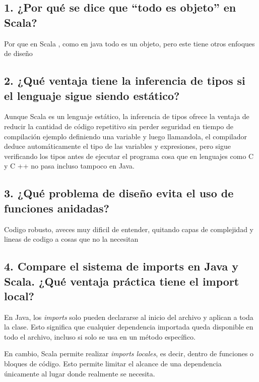 \documentclass[12pt]{article}
\begin{document}
\subsection*{1. ¿Por qué se dice que “todo es objeto” en Scala?}

Por que en Scala , como en java todo es un objeto, pero este tiene otros enfoques de diseño
\vspace{1cm}

\subsection*{2. ¿Qué ventaja tiene la inferencia de tipos si el lenguaje sigue siendo estático?}

Aunque Scala es un lenguaje estático, la inferencia de tipos ofrece la ventaja de reducir la cantidad de código repetitivo sin perder seguridad en tiempo de compilación ejemplo definiendo una variable y luego llamandola, el compilador deduce automáticamente el tipo de las variables y expresiones, pero sigue verificando los tipos antes de ejecutar el programa cosa que en lenguajes como C y C ++ no pasa incluso tampoco en Java.

\vspace{1cm}

\subsection*{3. ¿Qué problema de diseño evita el uso de funciones anidadas?}

Codigo robusto, aveces muy dificil de entender, quitando capas de complejidad y lineas de codigo a cosas que no la necesitan

\vspace{1cm}

\subsection*{4. Compare el sistema de imports en Java y Scala. ¿Qué ventaja práctica tiene el import local?}

En Java, los \textit{imports} solo pueden declararse al inicio del archivo y aplican a toda la clase. Esto significa que cualquier dependencia importada queda disponible en todo el archivo, incluso si solo se usa en un método específico.

En cambio, Scala permite realizar \textit{imports locales}, es decir, dentro de funciones o bloques de código. Esto permite limitar el alcance de una dependencia únicamente al lugar donde realmente se necesita.
\end{document}

